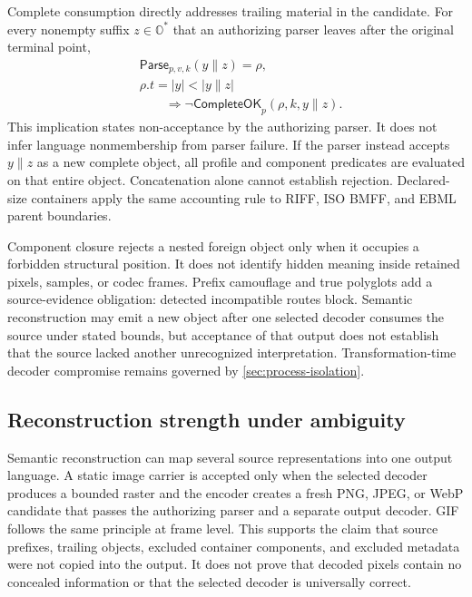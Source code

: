 Complete consumption directly addresses trailing material in the candidate.
For every nonempty suffix \(z\in\mathbb O^*\) that an authorizing parser leaves after the
original terminal point,
\begin{equation}
\begin{aligned}
  &\mathsf{Parse}_{p,v,k}(y\parallel z)=\rho,\\
  &\rho.t=|y|<|y\parallel z|\\
  &\qquad\Longrightarrow
  \neg\mathsf{CompleteOK}_{p}(\rho,k,y\parallel z).
\end{aligned}
  \label{eq:suffix-rejection}
\end{equation}
This implication states non-acceptance by the authorizing parser. It does not infer
language nonmembership from parser failure. If the parser instead accepts
\(y\parallel z\) as a new complete object, all profile and component predicates
are evaluated on that entire object. Concatenation alone cannot establish
rejection. Declared-size containers apply the same accounting rule to RIFF, ISO
BMFF, and EBML parent boundaries.

Component closure rejects a nested foreign object only when it occupies a
forbidden structural position. It does not identify hidden meaning inside
retained pixels, samples, or codec frames. Prefix camouflage and true polyglots
add a source-evidence obligation: detected incompatible routes block. Semantic
reconstruction may emit a new object after one selected decoder consumes the
source under stated bounds, but acceptance of that output does not establish
that the source lacked another unrecognized interpretation. Transformation-time
decoder compromise remains governed by \cref{sec:process-isolation}.

\subsection{Reconstruction strength under ambiguity}

Semantic reconstruction can map several source representations into one output
language. A static image carrier is accepted only when the selected decoder
produces a bounded raster and the encoder creates a fresh PNG, JPEG, or WebP
candidate that passes the authorizing parser and a separate output decoder. GIF follows
the same principle at frame level. This supports the claim that source prefixes,
trailing objects, excluded container components, and excluded metadata were not
copied into the output. It does not prove that decoded pixels contain no
concealed information or that the selected decoder is universally correct.

